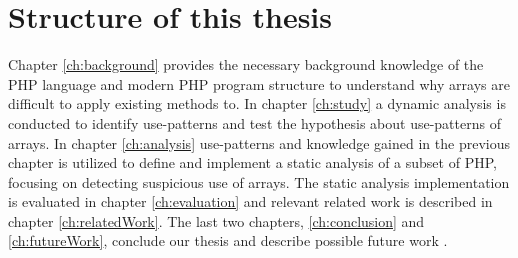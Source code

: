 
\section{Structure of this thesis}
Chapter \ref{ch:background} provides the necessary background knowledge of the PHP language and modern PHP program structure to understand why arrays are difficult to apply existing methods to. In chapter \ref{ch:study} a dynamic analysis is conducted to identify use-patterns and test the hypothesis about use-patterns of arrays. In chapter \ref{ch:analysis} use-patterns and knowledge gained in the previous chapter is utilized to define and implement a static analysis of a subset of PHP, focusing on detecting suspicious use of arrays. The static analysis implementation is evaluated in chapter \ref{ch:evaluation} and relevant related work is described in chapter \ref{ch:relatedWork}. The last two chapters, \ref{ch:conclusion} and \ref{ch:futureWork}, conclude our thesis and describe possible future work .

\begin{comment}

\section{Methodology}
To establish whether our three array types are accurate we dynamically analyse a range of popular open source PHP applications. We want to find operations that can be used to predict what type of array we are dealing with early in our static analysis.


\subsection{Metric}
\todo{In order to evaluate our results, we need to compare the performance of our tool against other similar tools wrt. the number of bugs found (real and false positives) and speed/scalability.}

\subsection{Benchmarks}

\subsection{Iterative process}

\end{comment}